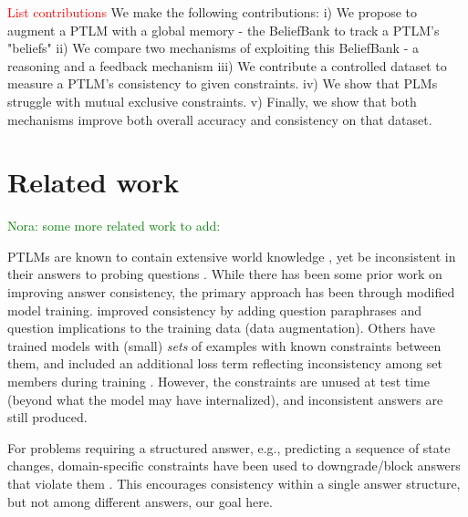 \documentclass[11pt]{article}
\newcommand{\nk}[1]{\textcolor{green}{Nora: #1}}
\newcommand{\red}[1]{\textcolor{red}{#1}}
\begin{document}
\red{List contributions}
We make the following contributions: i) We propose to augment a PTLM with a global memory - the BeliefBank to track a PTLM's "beliefs" ii) We compare two mechanisms of exploiting this BeliefBank - a reasoning and a feedback mechanism iii) We contribute a controlled dataset to measure a PTLM's consistency to given constraints. iv) We show that PLMs struggle with mutual exclusive constraints. v) Finally, we show that both mechanisms improve both overall accuracy and consistency on that dataset.

\section{Related work}

\nk{some more related work to add:
\cite{Thorne2020NeuralD}
\cite{Camburu2020MakeUY}
}


PTLMs are known to contain extensive world knowledge \cite{Petroni2019LanguageMA, roberts-etal-2020-much},
yet be inconsistent in their answers to probing questions \cite{ettinger-2020-bert, Kassner2020NegatedAM, ravichander-etal-2020-systematicity, Elazar2021MeasuringAI}.
While there has been some prior work on improving answer consistency, the primary approach
has been through modified model training. \citet{Ribeiro2019AreRR} improved consistency
by adding question paraphrases and question implications to the training data (data augmentation).
Others have trained models with (small) {\it sets} of examples with known constraints
between them, and included an additional loss term reflecting inconsistency among
set members during training \cite{Minervini2018AdversariallyRN,Li2019ALF,Asai2020LogicGuidedDA}.
However, the constraints are unused at test time (beyond what the model may have
internalized), and inconsistent answers are still produced.

For problems requiring a structured answer, e.g., predicting a sequence of
state changes, domain-specific constraints have been used to downgrade/block
answers that violate them \cite{Tandon2018ReasoningAA,Du2019BeCI}. This
encourages consistency within a single answer structure, but not among
different answers, our goal here.
\end{document}
